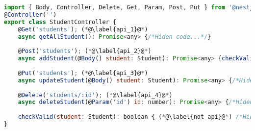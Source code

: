 \begin{lstlisting}[float,language=JavaScript,caption=Ví dụ về APIs trong mã nguồn dự án Typescript sử dụng framework NestJS, label=nest_api_example,captionpos=b]
import { Body, Controller, Delete, Get, Param, Post, Put } from '@nestjs/common';
@Controller('')
export class StudentController {
    @Get('students'); (*@\label{api_1}@*)
    async getAllStudent(): Promise<any> {/*Hiden code...*/}
    
    @Post('students'); (*@\label{api_2}@*)
    async addStudent(@Body() student: Student): Promise<any> {checkValid(body); (*@\label{call_normal_method}@*) /*Hiden code...*/}
        
    @Put('students'); (*@\label{api_3}@*)
    async updateStudent(@Body() student: Student): Promise<any> {/*Hiden code...*/}
    
    @Delete('students/:id'); (*@\label{api_4}@*)
    async deleteStudent(@Param('id') id: number): Promise<any> {/*Hiden code...*/}
    
    checkValid(student: Student): boolean { (*@\label{not_api}@*) /*Hiden code...*/ }
}
\end{lstlisting}

